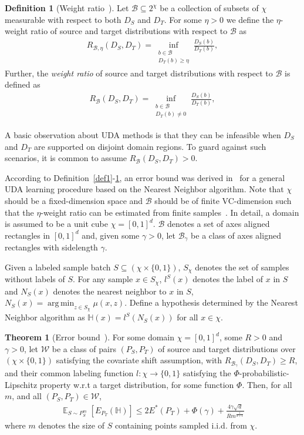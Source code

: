 \documentclass[journal,twocolumn]{IEEEtran}
\theoremstyle{definition}
\newtheorem{definition}{Definition}
\newtheorem{theorem}{Theorem}
\DeclareMathOperator*{\argmin}{arg\,min}
\begin{document}
\begin{definition}[Weight ratio~\cite{Ben-David2014}]
Let $\mathcal{B}\subseteq2^{\chi}$ be a collection of subsets of $\chi$ measurable with respect to both $D_S$ and $D_T$. For some $\eta>0$ we define the $\eta$-weight ratio of source and target distributions with respect to $\mathcal{B}$ as
\begin{align}
R_{\mathcal{B},\eta}(D_S,D_T)=\inf_{\substack{b\in\mathcal{B}\\
D_T(b)\geq\eta}}\frac{D_S(b)}{D_T(b)},
\end{align}
Further, the \textit{weight ratio} of source and target distributions with respect to $\mathcal{B}$ is defined as
\begin{align}
R_{\mathcal{B}}(D_S,D_T)=\inf_{\substack{b\in\mathcal{B}\\
D_T(b)\neq0}}\frac{D_S(b)}{D_T(b)},
\end{align}
\label{def3}
\end{definition}
A basic observation about UDA  methods is that they can be infeasible when $D_S$ and $D_T$ are supported on disjoint domain regions. To guard against such scenarios, it is common to assume $R_{\mathcal{B}}(D_S,D_T)>0$.

According to Definition~\ref{def1}-\ref{def3}, an error bound was derived in~\cite{Ben-David2014} for a general UDA learning procedure based on the Nearest Neighbor algorithm. Note that $\chi$ should be a fixed-dimension space and $\mathcal{B}$ should be of finite VC-dimension such that the $\eta$-weight ratio can be estimated from finite samples~\cite{Ben-David2014}. In detail, a domain is assumed to be a unit cube $\chi=[0,1]^d$. $\mathcal{B}$ denotes a set of axes aligned rectangles in $[0,1]^d$ and, given some $\gamma>0$, let $\mathcal{B}_{\gamma}$ be a class of axes aligned rectangles with sidelength $\gamma$.

Given a labeled sample batch $S\subseteq(\chi\times\{0, 1\})$,  $S_\chi$ denotes the set of samples without labels of $S$. For any sample $x\in S_{\chi}$, $l^S(x)$ denotes the label of $x$ in $S$ and $N_S(x)$ denotes the nearest neighbor to $x$ in $S$, $N_S(x)=\argmin_{z\in S_\chi}\mu(x,z)$. Define a hypothesis determined by the Nearest Neighbor algorithm as $\mathbb{H}(x)=l^S(N_S(x))$ for all $x\in\chi$.
\begin{theorem}[Error bound~\cite{Ben-David2014}]\label{the1}
For some domain $\chi=[0,1]^d$, some $R>0$ and $\gamma>0$, let $\mathcal{W}$ be a class of pairs $(P_S,P_T)$ of source and target distributions over $(\chi\times\{0, 1\})$ satisfying the covariate shift assumption, with $R_{\mathcal{B}_{\gamma}}(D_S,D_T)\geq R$, and their common labeling function $l:\chi\rightarrow\{0, 1\}$ satisfying the $\Phi$-probabilistic-Lipschitz property w.r.t a target distribution, for some function $\Phi$. Then, for all $m$, and all $(P_S,P_T)\in\mathcal{W}$,
\begin{align}
\mathop{\mathbb{E}}_{S\sim P_S^m}[E_{P_T}(\mathbb{H})]\leq2E^*(P_T)+\Phi(\gamma)+\frac{4\gamma\sqrt{d}}{Rm^{\frac{1}{d+1}}}
\label{eq4}
\end{align} 
where $m$ denotes the size of $S$ containing points sampled i.i.d. from $\chi$.
\end{theorem}
\end{document}
